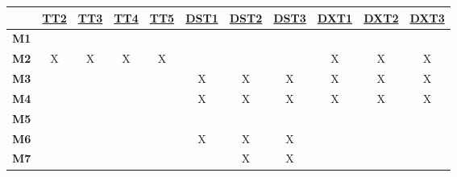 \documentclass[12pt, titlepage]{article}
\begin{document}
\begin{table}[H]
  \centering
  \begin{tabular}{|c|c|c|c|c|c|c|c|c|c|c|}
    \hline
                 & \hyperref[TT2]{TT2} & \hyperref[TT3]{TT3} & \hyperref[TT4]{TT4} & \hyperref[TT5]{TT5} & \hyperref[DST1]{DST1} & \hyperref[DST2]{DST2} & \hyperref[DST3]{DST3} & \hyperref[DXT1]{DXT1} & \hyperref[DXT2]{DXT2} & \hyperref[DXT3]{DXT3} \\
    \hline
    \textbf{M1}  &                     &                     &                     &                     &                       &                       &                       &                       &                       &                       \\ \hline
    \textbf{M2}  & X                   & X                   & X                   & X                   &                       &                       &                       & X                     & X                     & X                     \\ \hline
    \textbf{M3}  &                     &                     &                     &                     & X                     & X                     & X                     & X                     & X                     & X                     \\ \hline
    \textbf{M4}  &                     &                     &                     &                     & X                     & X                     & X                     & X                     & X                     & X                     \\ \hline
    \textbf{M5}  &                     &                     &                     &                     &                       &                       &                       &                       &                       &                       \\ \hline
    \textbf{M6}  &                     &                     &                     &                     & X                     & X                     & X                     &                       &                       &                       \\ \hline
    \textbf{M7}  &                     &                     &                     &                     &                       & X                     & X                     &                       &                       &                       \\ \hline

\end{tabular}
\end{table}
\end{document}
